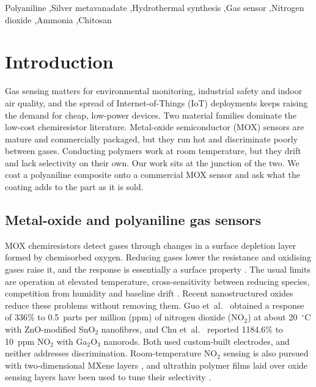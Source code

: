 \documentclass[preprint,11pt]{elsarticle}
\begin{document}
\begin{frontmatter}
\begin{keyword}
Polyaniline \sep Silver metavanadate \sep Hydrothermal synthesis \sep Gas sensor \sep Nitrogen dioxide \sep Ammonia \sep Chitosan
\end{keyword}

\end{frontmatter}

\section{Introduction}
\label{sec:intro}

Gas sensing matters for environmental monitoring, industrial safety and indoor air quality, and the spread of Internet-of-Things (IoT) deployments keeps raising the demand for cheap, low-power devices. Two material families dominate the low-cost chemiresistor literature. Metal-oxide semiconductor (MOX) sensors are mature and commercially packaged, but they run hot and discriminate poorly between gases. Conducting polymers work at room temperature, but they drift and lack selectivity on their own. Our work sits at the junction of the two. We coat a polyaniline composite onto a commercial MOX sensor and ask what the coating adds to the part as it is sold.

\subsection{Metal-oxide and polyaniline gas sensors}
\label{sec:lit-mox}
MOX chemiresistors detect gases through changes in a surface depletion layer formed by chemisorbed oxygen. Reducing gases lower the resistance and oxidising gases raise it, and the response is essentially a surface property \cite{fine2010mox}. The usual limits are operation at elevated temperature, cross-sensitivity between reducing species, competition from humidity and baseline drift \cite{fine2010mox,abdullah2022drift}. Recent nanostructured oxides reduce these problems without removing them. Guo et~al.\ \cite{guo2021sno2zno} obtained a response of 336\% to 0.5~parts per million (ppm) of nitrogen dioxide (NO$_2$) at about 20~$^{\circ}$C with ZnO-modified SnO$_2$ nanofibres, and Chu et~al.\ \cite{chu2023ga2o3} reported 1184.6\% to 10~ppm NO$_2$ with Ga$_2$O$_3$ nanorods. Both used custom-built electrodes, and neither addresses discrimination. Room-temperature NO$_2$ sensing is also pursued with two-dimensional MXene layers \cite{radhakrishnan2023mxene}, and ultrathin polymer films laid over oxide sensing layers have been used to tune their selectivity \cite{schroder2023polymerfilms}.
\end{document}

